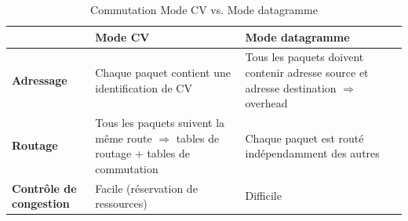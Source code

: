 \documentclass[11pt,english,french]{scrreprt}
\theoremstyle{remark}
\theoremstyle{definition}
\begin{document}
\begin{table}
\begin{tabularx}{\textwidth}{>{\bfseries}lXX} 
	\toprule
	 	& Mode CV & Mode datagramme\\[0.05in]\bottomrule
	Adressage 	& Chaque paquet contient une identification de CV & Tous les paquets doivent contenir adresse source et adresse destination $\Rightarrow$ overhead\\[0.05in]
	Routage 	& Tous les paquets suivent la même route $\Rightarrow$ tables de routage + tables de commutation & Chaque paquet est routé indépendamment des autres \\[0.05in]
	Contrôle de congestion & Facile (réservation de ressources) & Difficile \\
	\bottomrule
\end{tabularx}
\caption{Commutation Mode CV vs. Mode datagramme}
\end{table}
\end{document}
